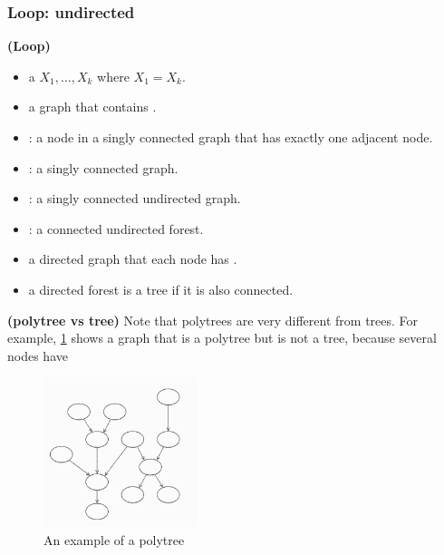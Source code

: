 \documentclass{article}
\newcommand{\bfs}[1]{\textbf{({#1}) }}
\begin{document}
\subsubsection{Loop: undirected}

\centerline{}

\begin{defa}\bfs{Loop}
\begin{itemize}
    \item {} a  $X_{1}, \ldots, X_{k}$ where $X_{1}=X_{k}$.
    \item {}  a graph that contains .
    \item  {}: a node in a singly connected graph that has exactly one adjacent node.
    \item {}: a singly connected  graph.
    \item {}: a singly connected undirected graph.
    \item {}: a connected undirected forest.
    \item {} a directed graph that each node has .
    \item  {} a directed forest is a tree if it is also connected.
\end{itemize}

\end{defa}
\begin{rema}\bfs{polytree vs tree}
Note that polytrees are very different from trees. For example, \cref{fig:polytree} shows a graph that is a polytree but is not a tree, because several nodes have  
\end{rema}
\begin{figure}
    \centering
    \includegraphics[width=0.4\textwidth]{Figs/a2.png}
    \caption{An example of a polytree}
    \label{fig:polytree}
\end{figure}
\end{document}
